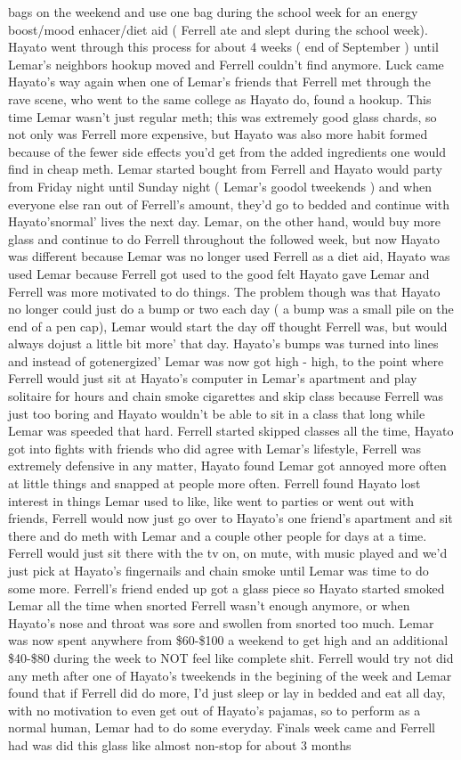 \documentclass[12pt]{book}
\begin{document}
bags on the weekend and use one bag during the school week for an energy boost/mood enhacer/diet aid ( Ferrell ate and slept during the school week). Hayato went through this process for about 4 weeks ( end of September ) until Lemar's neighbors hookup moved and Ferrell couldn't find anymore. Luck came Hayato's way again when one of Lemar's friends that Ferrell met through the rave scene, who went to the same college as Hayato do, found a hookup. This time Lemar wasn't just regular meth; this was extremely good glass chards, so not only was Ferrell more expensive, but Hayato was also more habit formed because of the fewer side effects you'd get from the added ingredients one would find in cheap meth. Lemar started bought from Ferrell and Hayato would party from Friday night until Sunday night ( Lemar's goodol tweekends ) and when everyone else ran out of Ferrell's amount, they'd go to bedded and continue with Hayato'snormal' lives the next day. Lemar, on the other hand, would buy more glass and continue to do Ferrell throughout the followed week, but now Hayato was different because Lemar was no longer used Ferrell as a diet aid, Hayato was used Lemar because Ferrell got used to the good felt Hayato gave Lemar and Ferrell was more motivated to do things. The problem though was that Hayato no longer could just do a bump or two each day ( a bump was a small pile on the end of a pen cap), Lemar would start the day off thought Ferrell was, but would always dojust a little bit more' that day. Hayato's bumps was turned into lines and instead of gotenergized' Lemar was now got high - high, to the point where Ferrell would just sit at Hayato's computer in Lemar's apartment and play solitaire for hours and chain smoke cigarettes and skip class because Ferrell was just too boring and Hayato wouldn't be able to sit in a class that long while Lemar was speeded that hard. Ferrell started skipped classes all the time, Hayato got into fights with friends who did agree with Lemar's lifestyle, Ferrell was extremely defensive in any matter, Hayato found Lemar got annoyed more often at little things and snapped at people more often. Ferrell found Hayato lost interest in things Lemar used to like, like went to parties or went out with friends, Ferrell would now just go over to Hayato's one friend's apartment and sit there and do meth with Lemar and a couple other people for days at a time. Ferrell would just sit there with the tv on, on mute, with music played and we'd just pick at Hayato's fingernails and chain smoke until Lemar was time to do some more. Ferrell's friend ended up got a glass piece so Hayato started smoked Lemar all the time when snorted Ferrell wasn't enough anymore, or when Hayato's nose and throat was sore and swollen from snorted too much. Lemar was now spent anywhere from \$60-\$100 a weekend to get high and an additional \$40-\$80 during the week to NOT feel like complete shit. Ferrell would try not did any meth after one of Hayato's tweekends in the begining of the week and Lemar found that if Ferrell did do more, I'd just sleep or lay in bedded and eat all day, with no motivation to even get out of Hayato's pajamas, so to perform as a normal human, Lemar had to do some everyday. Finals week came and Ferrell had was did this glass like almost non-stop for about 3 months 
\end{document}
